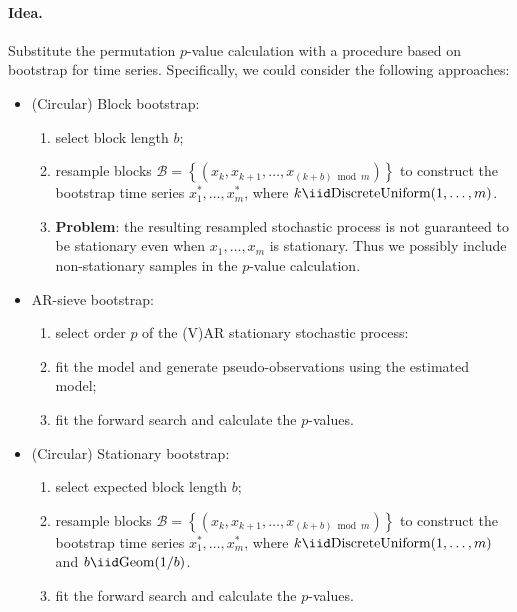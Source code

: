 \documentclass{article}
\begin{document}
\paragraph{Idea.} Substitute the permutation $ p$-value calculation with a procedure based on bootstrap for time series.
Specifically, we could consider the following approaches:
\begin{itemize}
    \item (\textsf{Circular}) \textsf{Block bootstrap}:
        \begin{enumerate}[label=\arabic*.]
            \item select block length $b$;
            \item resample blocks $ \mathcal{B} = \left\{ (x_{k}, x_{k+1}, \ldots, x_{(k + b)\bmod m}) \right\}$ to construct the bootstrap time series $ x^*_1, \ldots, x^*_m$, where $ k \iid \text{DiscreteUniform}(1, \ldots, m)$.
            \item \textbf{Problem}: the resulting resampled stochastic process is not guaranteed to be stationary even when $ x_1, \ldots, x_m$ is stationary.
                Thus we possibly include non-stationary samples in the $ p$-value calculation.
        \end{enumerate}

    \item \textsf{AR-sieve bootstrap}:
        \begin{enumerate}[label=\arabic*.]
            \item select order $ p$ of the (V)AR stationary stochastic process:
            \item fit the model and generate pseudo-observations using the estimated model;
            \item fit the forward search and calculate the $ p$-values.
        \end{enumerate}
                
    \item (\textsf{Circular}) \textsf{Stationary bootstrap}:
        \begin{enumerate}[label=\arabic*.]
            \item select expected block length $ b$;
            \item resample blocks $ \mathcal{B} = \left\{ (x_{k}, x_{k+1}, \ldots, x_{(k + b)\bmod m}) \right\}$ to construct the bootstrap time series $ x^*_1, \ldots, x^*_m$, where $ k \iid \text{DiscreteUniform}(1, \ldots, m)$ and $ b \iid \text{Geom}(1/b)$.
            \item fit the forward search and calculate the $ p$-values.
        \end{enumerate}
\end{itemize}

\printbibliography
\end{document}
